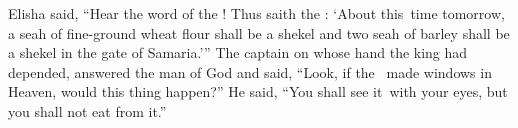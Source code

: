 
\begin{inparaenum}
   Elisha said, ``Hear the word of the \lord! Thus saith the \lord: `About this\understood\ time tomorrow, a seah of fine-ground wheat flour shall be a shekel and two seah of barley shall be a shekel in the gate of Samaria.'\thinspace''%
   The captain on whose hand the king had depended, answered the man of God and said, ``Look, if the \lord\ made windows in Heaven, would this thing happen?'' He said, ``You shall see it\understood\ with your eyes, but you shall not eat from it.''%
  

\end{inparaenum}
